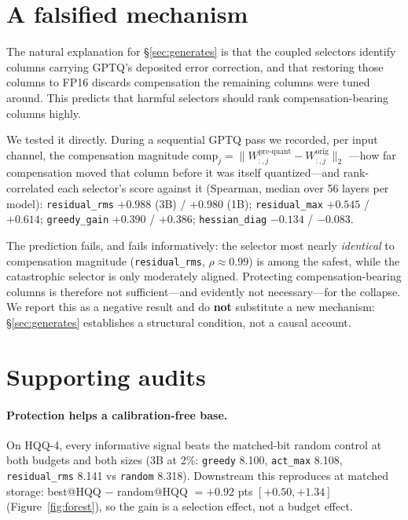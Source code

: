 \documentclass[11pt]{article}
\begin{document}
\section{A falsified mechanism}
\label{sec:falsified}

The natural explanation for \S\ref{sec:generates} is that the coupled selectors identify columns
carrying GPTQ's deposited error correction, and that restoring those columns to FP16 discards
compensation the remaining columns were tuned around. This predicts that harmful selectors
should rank compensation-bearing columns highly.

We tested it directly. During a sequential GPTQ pass we recorded, per input channel, the
compensation magnitude $\mathrm{comp}_j = \lVert W^{\text{pre-quant}}_{:,j} - W^{\text{orig}}_{:,j}\rVert_2$
---how far compensation moved that column before it was itself quantized---and rank-correlated
each selector's score against it (Spearman, median over 56 layers per model):
\texttt{residual\_rms} $+0.988$ (3B) / $+0.980$ (1B); \texttt{residual\_max} $+0.545$ / $+0.614$;
\texttt{greedy\_gain} $+0.390$ / $+0.386$; \texttt{hessian\_diag} $-0.134$ / $-0.083$.

The prediction fails, and fails informatively: the selector most nearly \emph{identical} to
compensation magnitude (\texttt{residual\_rms}, $\rho \approx 0.99$) is among the safest, while
the catastrophic selector is only moderately aligned. Protecting compensation-bearing columns is
therefore not sufficient---and evidently not necessary---for the collapse. We report this as a
negative result and do \textbf{not} substitute a new mechanism: \S\ref{sec:generates}
establishes a structural condition, not a causal account.

\section{Supporting audits}
\label{sec:audits}

\paragraph{Protection helps a calibration-free base.} On HQQ-4, every informative signal beats
the matched-bit random control at both budgets and both sizes (3B at 2\%: \texttt{greedy} 8.100,
\texttt{act\_max} 8.108, \texttt{residual\_rms} 8.141 vs \texttt{random} 8.318). Downstream this
reproduces at matched storage: best@HQQ $-$ random@HQQ $= +0.92$ pts $[+0.50, +1.34]$
(Figure~\ref{fig:forest}), so the gain is a selection effect, not a budget effect.
\end{document}
